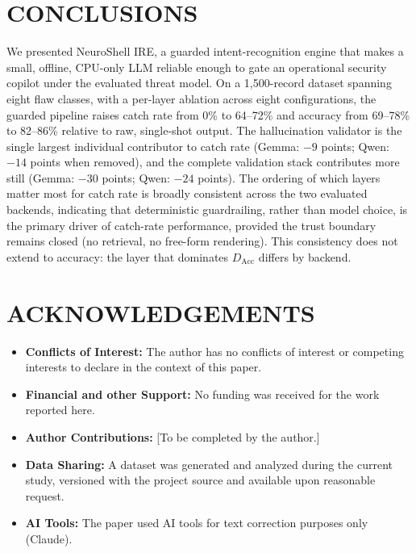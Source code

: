 \documentclass[a4paper,twoside]{article}
\begin{document}
\section{\uppercase{Conclusions}}
\label{sec:conclusion}

\noindent We presented NeuroShell IRE, a guarded intent-recognition engine that makes a small, offline, CPU-only LLM reliable enough to gate an operational security copilot under the evaluated threat model. On a 1,500-record dataset spanning eight flaw classes, with a per-layer ablation across eight configurations, the guarded pipeline raises catch rate from 0\% to 64--72\% and accuracy from 69--78\% to 82--86\% relative to raw, single-shot output. The hallucination validator is the single largest individual contributor to catch rate (Gemma: $-9$ points; Qwen: $-14$ points when removed), and the complete validation stack contributes more still (Gemma: $-30$ points; Qwen: $-24$ points). The ordering of which layers matter most for catch rate is broadly consistent across the two evaluated backends, indicating that deterministic guardrailing, rather than model choice, is the primary driver of catch-rate performance, provided the trust boundary remains closed (no retrieval, no free-form rendering). This consistency does not extend to accuracy: the layer that dominates $D_{\mathrm{Acc}}$ differs by backend.


\section*{\uppercase{Acknowledgements}}

\begin{itemize}
  \item \textbf{Conflicts of Interest:} The author has no conflicts of interest or competing interests to declare in the context of this paper.
  \item \textbf{Financial and other Support:} No funding was received for the work reported here.
  \item \textbf{Author Contributions:} [To be completed by the author.]
  \item \textbf{Data Sharing:} A dataset was generated and analyzed during the current study, versioned with the project source and available upon reasonable request.
  \item \textbf{AI Tools:} The paper used AI tools for text correction purposes only (Claude).
\end{itemize}



{\small
}
\end{document}
